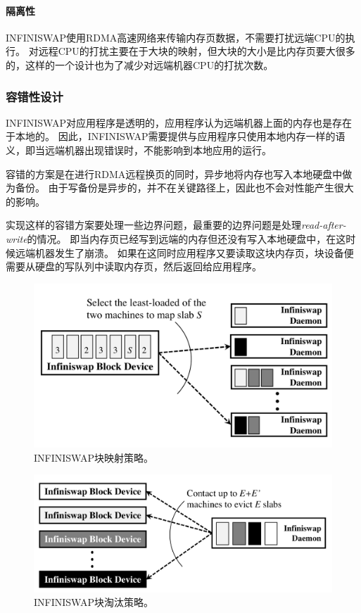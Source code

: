 \paragraph{隔离性}
INFINISWAP使用RDMA高速网络来传输内存页数据，不需要打扰远端CPU的执行。
对远程CPU的打扰主要在于大块的映射，但大块的大小是比内存页要大很多的，这样的一个设计也为了减少对远端机器CPU的打扰次数。

\subsubsection{容错性设计}
INFINISWAP对应用程序是透明的，应用程序认为远端机器上面的内存也是存在于本地的。
因此，INFINISWAP需要提供与应用程序只使用本地内存一样的语义，即当远端机器出现错误时，不能影响到本地应用的运行。

容错的方案是在进行RDMA远程换页的同时，异步地将内存也写入本地硬盘中做为备份。
由于写备份是异步的，并不在关键路径上，因此也不会对性能产生很大的影响。

实现这样的容错方案要处理一些边界问题，最重要的边界问题是处理\emph{read-after-write}的情况。
即当内存页已经写到远端的内存但还没有写入本地硬盘中，在这时候远端机器发生了崩溃。
如果在这同时应用程序又要读取这块内存页，块设备便需要从硬盘的写队列中读取内存页，然后返回给应用程序。

\begin{figure}
\centering
\includegraphics[scale=0.3]{Figures/memory/infiniswap_slab_mapping.png}
\decoRule
\caption{INFINISWAP块映射策略\cite{gu2017efficient}。}
\label{fig:infiniswap_slab_mapping}
\end{figure}

\begin{figure}
\centering
\includegraphics[scale=0.3]{Figures/memory/infiniswap_slab_eviction.png}
\decoRule
\caption{INFINISWAP块淘汰策略\cite{gu2017efficient}。}
\label{fig:infiniswap_slab_eviction}
\end{figure}

